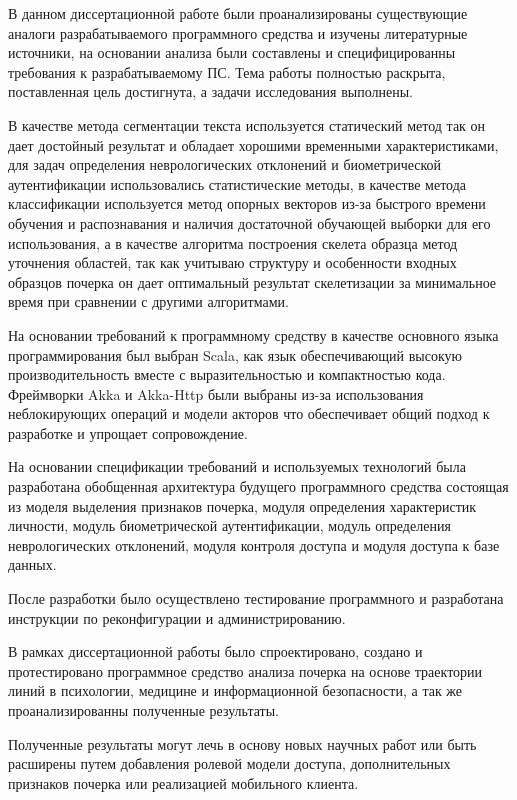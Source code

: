 \label{sec:outro}

В данном диссертационной работе были проанализированы существующие аналоги разрабатываемого программного средства и изучены литературные источники, на основании анализа были составлены и специфицированны требования к разрабатываемому ПС. Тема работы полностью раскрыта, поставленная цель достигнута, а задачи исследования выполнены.

В качестве метода сегментации текста используется статический метод так он дает достойный результат и обладает хорошими временными характеристиками, для задач определения неврологических отклонений и биометрической аутентификации использовались статистические методы, в качестве метода классификации используется метод опорных векторов из-за быстрого времени обучения и распознавания и наличия достаточной обучающей выборки для его использования, а в качестве алгоритма построения скелета образца метод уточнения областей, так как учитываю структуру и особенности входных образцов почерка он дает оптимальный результат скелетизации за минимальное время при сравнении с другими алгоритмами.

На основании требований к программному средству в качестве основного языка программирования был выбран Scala, как язык обеспечивающий высокую производительность вместе с выразительностью и компактностью кода. Фреймворки Akka и Akka-Http были выбраны из-за использования неблокирующих операций и модели акторов что обеспечивает общий подход к разработке и упрощает сопровождение.

На основании спецификации требований и используемых технологий была разработана обобщенная архитектура будущего программного средства состоящая из моделя выделения признаков почерка, модуля определения характеристик личности, модуль биометрической аутентификации, модуль определения неврологических отклонений, модуля контроля доступа и модуля доступа к базе данных.

После разработки было осуществлено тестирование программного и разработана инструкции по реконфигурации и администрированию.

В рамках диссертационной работы было спроектировано, создано и протестировано программное средство анализа почерка на основе траектории линий в психологии, медицине и информационной безопасности, а так же проанализированны полученные результаты. 

Полученные результаты могут лечь в основу новых научных работ или быть расширены путем добавления ролевой модели доступа, дополнительных признаков почерка или реализацией мобильного клиента.

